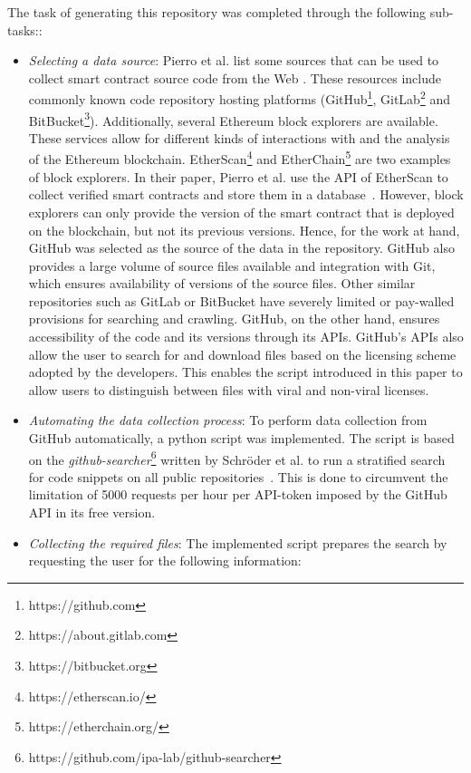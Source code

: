 \documentclass[10pt,conference]{IEEEtran}
\begin{document}
	The task of generating this repository was completed through the following sub-tasks::
	\begin{itemize}
		\item \textit{Selecting a data source}: Pierro et al. list some sources that can be used to collect smart contract source code from the Web \cite{pierro}. These resources include commonly known code repository hosting platforms (GitHub\footnote{https://github.com}, GitLab\footnote{https://about.gitlab.com} and BitBucket\footnote{https://bitbucket.org}). Additionally, several Ethereum block explorers are available. These services allow for different kinds of interactions with and the analysis of the Ethereum blockchain. EtherScan\footnote{https://etherscan.io/} and EtherChain\footnote{https://etherchain.org/} are two examples of block explorers. In their paper, Pierro et al. use the API of EtherScan to collect verified smart contracts and store them in a database~\cite{pierro}. However, block explorers can only provide the version of the smart contract that is deployed on the blockchain, but not its previous versions. Hence, for the work at hand, GitHub was selected as the source of the data in the repository. GitHub also provides a large volume of source files available and integration with Git, which ensures availability of versions of the source files. Other similar repositories such as GitLab or BitBucket have severely limited or pay-walled provisions for searching and crawling. GitHub, on the other hand, ensures accessibility of the code and its versions through its APIs. GitHub's APIs also allow the user to search for and download files based on the licensing scheme adopted by the developers. This enables the script introduced in this paper to allow users to distinguish between files with viral and non-viral licenses. 
		\item \textit{Automating the data collection process}: To perform data collection from GitHub automatically, a python script was implemented. The script is based on the \textit{github-searcher}\footnote{https://github.com/ipa-lab/github-searcher} written by Schröder et al. to run a stratified search for code snippets on all public repositories~\cite{schroder}. This is done to circumvent the limitation of 5000 requests per hour per API-token imposed by the GitHub API in its free version.
		\item \textit{Collecting the required files}: The implemented script prepares the search by requesting the user for the following information:
		\begin{itemize}

\end{itemize}
\end{itemize}
\end{document}
